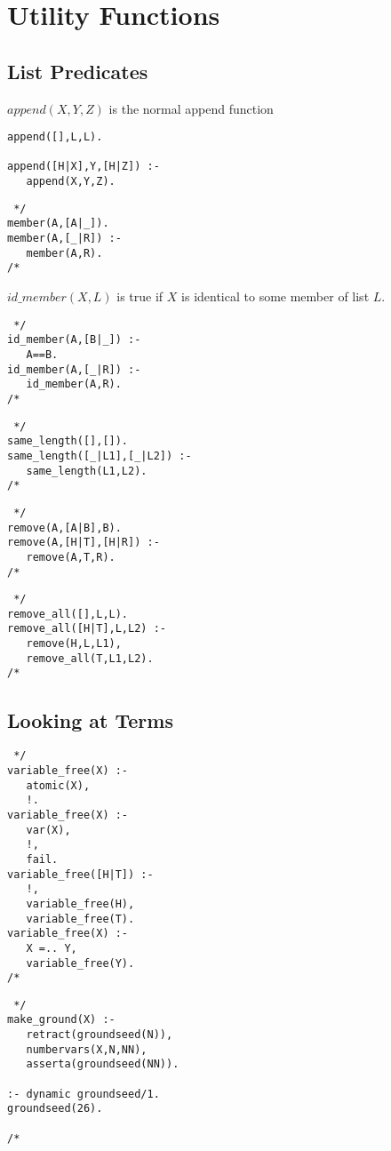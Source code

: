 \section{Utility Functions}
\subsection{List Predicates}
$append(X,Y,Z)$ is the normal append function
\begin{verbatim} 
append([],L,L).

append([H|X],Y,[H|Z]) :-
   append(X,Y,Z).
\end{verbatim}

\begin{verbatim} */
member(A,[A|_]).
member(A,[_|R]) :-
   member(A,R).
/* \end{verbatim}

$id\_member(X,L)$ is true if $X$ is identical to some member of list $L$.
\begin{verbatim} */
id_member(A,[B|_]) :-
   A==B.
id_member(A,[_|R]) :-
   id_member(A,R).
/* \end{verbatim}

\begin{verbatim} */
same_length([],[]).
same_length([_|L1],[_|L2]) :-
   same_length(L1,L2).
/* \end{verbatim}

\begin{verbatim} */
remove(A,[A|B],B).
remove(A,[H|T],[H|R]) :-
   remove(A,T,R).
/* \end{verbatim}

\begin{verbatim} */
remove_all([],L,L).
remove_all([H|T],L,L2) :-
   remove(H,L,L1),
   remove_all(T,L1,L2).
/* \end{verbatim}

\subsection{Looking at Terms}
\begin{verbatim} */
variable_free(X) :-
   atomic(X),
   !.
variable_free(X) :-
   var(X),
   !,
   fail.
variable_free([H|T]) :-
   !,
   variable_free(H),
   variable_free(T).
variable_free(X) :-
   X =.. Y,
   variable_free(Y).
/* \end{verbatim}

\begin{verbatim} */
make_ground(X) :-
   retract(groundseed(N)),
   numbervars(X,N,NN),
   asserta(groundseed(NN)).

:- dynamic groundseed/1.
groundseed(26).

/* \end{verbatim}

